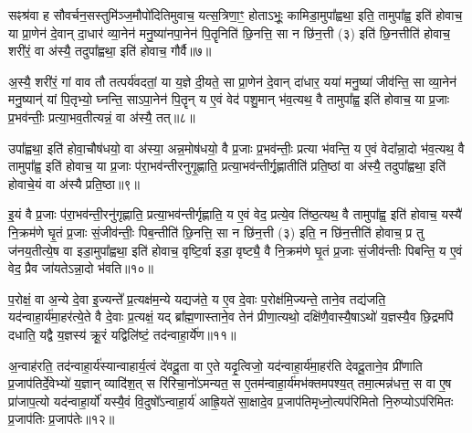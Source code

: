 {\anuvakamend[{वि॒द्वान्ध्या॑ये॒ द्यं प्रा॒श्ञन्ति॒ यां वै म॒ एका॒न्नविꣳ॑श॒तिश्च॑॥१॥}]}

सꣴश्र॑वा ह सौवर्चन॒सस्तुमि॑ञ्ज॒मौपो॑दितिमुवाच॒ यत्स॒त्रिणा॒ꣳ॒ होता\-ऽभूः॒ कामिडा॒मुपा᳚ह्वथा॒ इति॒ तामुपा᳚ह्व॒ इति॑ होवाच॒ या प्रा॒णेन॑ दे॒वान् दा॒धार॑ व्या॒नेन॑ मनु॒ष्या॑नपा॒नेन॑ पि॒तॄनिति॑ छि॒नत्ति॒ सा न छि॑न॒त्ती (३) इति॑ छि॒नत्तीति॑ होवाच॒ शरी॑रं॒ वा अ॑स्यै॒ तदुपा᳚ह्वथा॒ इति॑ होवाच॒ गौर्वै॥७॥

अ॒स्यै॒ शरी॑रं॒ गां वाव तौ तत्पर्य॑वदतां॒ या य॒ज्ञे दी॒यते॒ सा प्रा॒णेन॑ दे॒वान् दा॑धार॒ यया॑ मनु॒ष्या॑ जीव॑न्ति॒ सा व्या॒नेन॑ मनु॒ष्यान्॑ यां पि॒तृभ्यो॒ घ्नन्ति॒ सा\-ऽपा॒नेन॑ पि॒तॄन् य ए॒वं वेद॑ पशु॒मान् भ॑व॒त्यथ॒ वै तामुपा᳚ह्व॒ इति॑ होवाच॒ या प्र॒जाः प्र॒भव॑न्तीः॒ प्रत्या॒भव॒तीत्यन्नं॒ वा अ॑स्यै॒ तत्॥८॥

उपा᳚ह्वथा॒ इति॑ होवा॒चौष॑धयो॒ वा अ॑स्या॒ अन्न॒मोष॑धयो॒ वै प्र॒जाः प्र॒भव॑न्तीः॒ प्रत्या भ॑वन्ति॒ य ए॒वं वेदा᳚न्ना॒दो भ॑व॒त्यथ॒ वै तामुपा᳚ह्व॒ इति॑ होवाच॒ या प्र॒जाः प॑रा॒भव॑न्तीरनुगृ॒ह्णाति॒ प्रत्या॒भव॑न्तीर्गृ॒ह्णातीति॑ प्रति॒ष्ठां वा अ॑स्यै॒ तदुपा᳚ह्वथा॒ इति॑ होवाचे॒यं वा अ॑स्यै प्रति॒ष्ठा॥९॥

इ॒यं वै प्र॒जाः प॑रा॒भव॑न्ती॒रनु॑गृह्णाति॒ प्रत्या॒भव॑न्तीर्गृह्णाति॒ य ए॒वं वेद॒ प्रत्ये॒व ति॑ष्ठ॒त्यथ॒ वै तामुपा᳚ह्व॒ इति॑ होवाच॒ यस्यै॑ नि॒क्रम॑णे घृ॒तं प्र॒जाः सं॒जीव॑न्तीः॒ पिब॒न्तीति॑ छि॒नत्ति॒ सा न छि॑न॒त्ती (३) इति॒ न छि॑न॒त्तीति॑ होवाच॒ प्र तु ज॑नय॒तीत्ये॒ष वा इडा॒मुपा᳚ह्वथा॒ इति॑ होवाच॒ वृष्टि॒र्वा इडा॒ वृष्ट्यै॒ वै नि॒क्रम॑णे घृ॒तं प्र॒जाः सं॒जीव॑न्तीः पिबन्ति॒ य ए॒वं वेद॒ प्रैव जा॑यते\-ऽन्ना॒दो भ॑वति॥१०॥

{\anuvakamend[{गौर्वा अ॑स्यै॒ तत् प्र॑ति॒ष्ठा\-ऽह्व॑था॒ इति॑ विꣳश॒तिश्च॑॥२॥}]}

प॒रोक्षं॒ वा अ॒न्ये दे॒वा इ॒ज्यन्ते᳚ प्र॒त्यक्ष॑म॒न्ये यद्यज॑ते॒ य ए॒व दे॒वाः प॒रोक्ष॑मि॒ज्यन्ते॒ ताने॒व तद्य॑जति॒ यद॑न्वाहा॒र्य॑मा॒हर॑त्ये॒ते वै दे॒वाः प्र॒त्यक्षं॒ यद् ब्रा᳚ह्म॒णास्ताने॒व तेन॑ प्रीणा॒त्यथो॒ दक्षि॑णै॒वास्यै॒षा\-ऽथो॑ य॒ज्ञस्यै॒व छि॒द्रमपि॑ दधाति॒ यद्वै य॒ज्ञस्य॑ क्रू॒रं यद्विलि॑ष्टं॒ तद॑न्वाहा॒र्ये॑ण॥११॥

अ॒न्वाह॑रति॒ तद॑न्वाहा॒र्य॑स्यान्वाहार्य॒त्वं दे॑वदू॒ता वा ए॒ते यदृ॒त्विजो॒ यद॑न्वाहा॒र्य॑मा॒हर॑ति देवदू॒ताने॒व प्री॑णाति प्र॒जाप॑तिर्दे॒वेभ्यो॑ य॒ज्ञान् व्यादि॑श॒त् स रि॑रिचा॒नो॑\-ऽमन्यत॒ स ए॒तम॑न्वाहा॒र्य॑मभ॑क्तमपश्य॒त् तमा॒त्मन्न॑धत्त॒ स वा ए॒ष प्रा॑जाप॒त्यो यद॑न्वाहा॒र्यो॑ यस्यै॒वं वि॒दुषो᳚\-ऽन्वाहा॒र्य॑ आह्रि॒यते॑ सा॒क्षादे॒व प्र॒जाप॑तिमृध्नो॒त्यप॑रिमितो नि॒रुप्यो\-ऽप॑रिमितः प्र॒जाप॑तिः प्र॒जाप॑तेः॥१२॥

